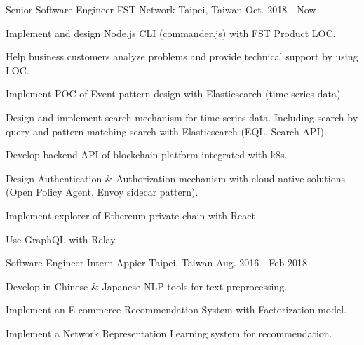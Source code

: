 

\begin{cventries}

	\cventry
	{Senior Software Engineer} %
	{FST Network} %
	{Taipei, Taiwan} %
	{Oct. 2018 - Now} %
	{
		\begin{cvitems} %
			\item {Implement and design Node.js CLI (commander.js) with FST Product LOC.}
			\item {Help business customers analyze problems and provide technical support by using LOC.}
			\item {Implement POC of Event pattern design with Elasticsearch (time series data).}
			\item {Design and implement search mechanism for time series data. Including search by query and pattern matching search with Elasticsearch (EQL, Search API).}
			\item {Develop backend API of blockchain platform integrated with k8s.}
			\item {Design Authentication \& Authorization mechanism with cloud native solutions (Open Policy Agent, Envoy sidecar pattern).}
			\item {Implement explorer of Ethereum private chain with React}
			\item {Use GraphQL with Relay}
		\end{cvitems}
	}

	\cventry
	{Software Engineer Intern} %
	{Appier} %
	{Taipei, Taiwan} %
	{Aug. 2016 - Feb 2018} %
	{
		\begin{cvitems} %
			\item {Develop in Chinese \& Japanese NLP tools for text preprocessing.}
			\item {Implement an E-commerce Recommendation System with Factorization model.}
			\item {Implement a Network Representation Learning system for recommendation.}
		\end{cvitems}
	}


\end{cventries}
